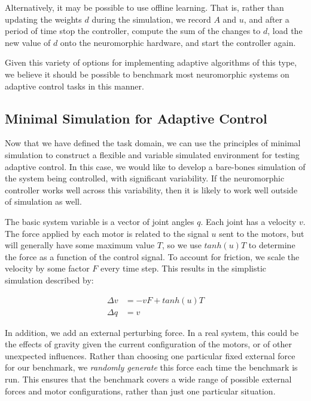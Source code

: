 \documentclass{frontiersSCNS} %
\begin{document}
Alternatively, it may be possible to use offline learning.  That is, rather than updating
the weights $d$ during the simulation, we record $A$ and $u$, and after
a period of time stop the controller, compute the sum of the changes
to $d$, load the new value of $d$ onto the neuromorphic hardware, and
start the controller again.

Given this variety of options for implementing adaptive algorithms of this type, 
we believe it should be possible to benchmark most neuromorphic systems on 
adaptive control tasks in this manner.

\subsection{Minimal Simulation for Adaptive Control}

Now that we have defined the task domain, we can use the principles of minimal
simulation to construct a flexible and variable simulated environment for
testing adaptive control.  In this case, we would like to develop a bare-bones simulation of
the system being controlled, with significant variability.  If the neuromorphic
controller works well across this variability, then it is likely to work well
outside of simulation as well.

The basic system variable is a vector of joint angles $q$.  
Each joint has a velocity $v$.  The force applied by each motor is 
related to the signal $u$ sent to the motors, but will generally have some
maximum value $T$, so we use $tanh(u)T$ to determine the force as a function of the control signal. To account for friction, we 
scale the velocity by some factor $F$ every time step.  
This results in the simplistic simulation described by:

\begin{align}
    \Delta v & =  -v F + tanh(u)T \\
    \Delta q & = v
\end{align}

In addition, we add an external perturbing force.  In a real system,
this could be the effects of gravity given the current configuration of the
motors, or of other unexpected influences.  
Rather than choosing one particular fixed external force for our benchmark,
we \emph{randomly generate} this force each time the benchmark is run.  This
ensures that the benchmark covers a wide range of possible external forces
and motor configurations, rather than just one particular situation.
\end{document}
